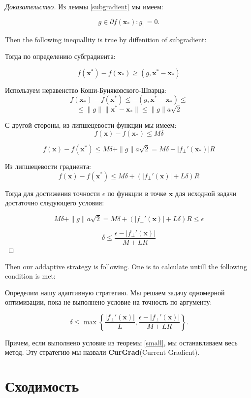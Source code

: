 \documentclass[12pt]{article}
\begin{document}
\begin{proof}[Доказательство]

Из леммы \ref{subgradient} мы имеем:

$$g \in \partial f(\textbf{x}_*): g_\parallel = 0.$$

Then the following inequallity is true by diffenition of subgradient:

Тогда по определению субградиента:

$$f(\textbf{x}^*) - f(\textbf{x}_*) \geq (g, \textbf{x}^* - \textbf{x}_*)$$

Используем неравенство Коши-Буняковского-Шварца:
$$f(\textbf{x}_*) - f(\textbf{x}^*) \leq -(g, \textbf{x}^* - \textbf{x}_* )\leq$$
$$\leq \|g\| \|\textbf{x}^* - \textbf{x}_*\|\leq \|g\|a\sqrt{2}$$

С другой стороны, из липшецевости функции мы имеем:
$$f(\textbf{x})-f(\textbf{x}_*)\leq M\delta$$

$$f(\textbf{x})-f(\textbf{x}^*) \leq M\delta +\|g\|a\sqrt{2} = M\delta + |f_\perp'(\textbf{x}_*)|R$$

Из липшецевости градиента:
$$f(\textbf{x})-f(\textbf{x}^*) \leq M\delta + \left(|f_\perp'(\textbf{x})|+L\delta\right)R$$

Тогда для достижения точности $\epsilon$ по функции в точке $\textbf{x}$ для исходной задачи достаточно следующего условия:

$$M\delta +\|g\|a\sqrt{2} = M\delta + \left(|f_\perp'(\textbf{x})|+L\delta\right)R \leq \epsilon$$

$$\delta \leq \frac{\epsilon - |f_\perp'(\textbf{x})|}{M+LR}$$
\end{proof}

Then our addaptive strategy is following. One is to calculate untill the following condition is met:

Определим нашу адаптивную стратегию. Мы решаем задачу одномерной оптимизации, пока не выполнено условие на точность по аргументу:

\begin{equation}
\label{Adaptive}
\delta \leq \max\left\{
	\frac{|f_\perp'(\textbf{x})|}{L}, 
	\frac{\epsilon - |f_\perp'(\textbf{x})|}{M+LR}
	\right\}.
\end{equation}

Причем, если выполнено условие из теоремы \ref{small}, мы останавливаем весь метод. Эту стратегию мы назвали \textbf{CurGrad}(Current Gradient).


\section{Сходимость}
\end{document}

